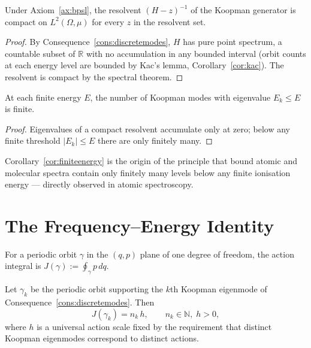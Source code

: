 \begin{lemma}
\label{lem:compactres}
Under Axiom~\ref{ax:bpsl}, the resolvent $(H-z)^{-1}$ of the Koopman
generator is compact on $L^{2}(\Omega,\mu)$ for every $z$ in the
resolvent set.
\end{lemma}

\begin{proof}
By Consequence~\ref{cons:discretemodes}, $H$ has pure point spectrum, a
countable subset of $\mathbb{R}$ with no accumulation in any bounded
interval (orbit counts at each energy level are bounded by Kac's lemma,
Corollary~\ref{cor:kac}).
The resolvent is compact by the spectral theorem.
\end{proof}

\begin{corollary}
\label{cor:finiteenergy}
At each finite energy $E$, the number of Koopman modes with eigenvalue
$E_{k}\le E$ is finite.
\end{corollary}

\begin{proof}
Eigenvalues of a compact resolvent accumulate only at zero; below any
finite threshold $|E_{k}|\le E$ there are only finitely many.
\end{proof}

\begin{remark}
Corollary~\ref{cor:finiteenergy} is the origin of the principle that bound
atomic and molecular spectra contain only finitely many levels below any
finite ionisation energy --- directly observed in atomic spectroscopy.
\end{remark}

\section{The Frequency--Energy Identity}
\label{sec:ch3-energyfreq}
\label{sec:energyfrequency}

\begin{definition}
\label{def:bsaction}
For a periodic orbit $\gamma$ in the $(q,p)$ plane of one degree of
freedom, the action integral is $J(\gamma):=\oint_{\gamma}p\,dq$.
\end{definition}

\begin{lemma}
\label{lem:actionquantised}
Let $\gamma_{k}$ be the periodic orbit supporting the $k$th Koopman
eigenmode of Consequence~\ref{cons:discretemodes}.
Then
\begin{equation}
  J(\gamma_{k}) = n_{k}\,h, \qquad n_{k}\in\mathbb{N},\; h>0,
  \label{eq:bohrsommerfeld}
\end{equation}
where $h$ is a universal action scale fixed by the requirement that
distinct Koopman eigenmodes correspond to distinct actions.
\end{lemma}

